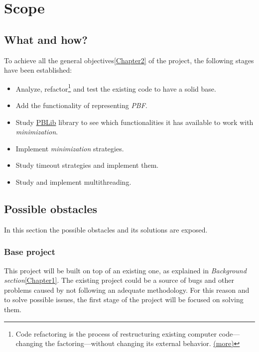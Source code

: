 \chapter{Scope} %

\label{Chapter3} %

\section{What and how?}

To achieve all the general objectives\ref{Chapter2} of the project, the following stages have been established:
\begin{itemize}
	\item Analyze, refactor\footnote{Code refactoring is the process of restructuring existing computer code—changing the factoring—without changing its external behavior. \href{https://en.wikipedia.org/wiki/Code_refactoring}{(more)}} and test the existing code to have a solid base. 
	\item Add the functionality of representing \emph{PBF}.
	\item Study \href{http://tools.computational-logic.org/content/pblib.php}{PBLib} library to see which functionalities it has available to work with \emph{minimization}.
	\item Implement \emph{minimization} strategies.
	\item Study timeout strategies and implement them.
	\item Study and implement multithreading.
\end{itemize}

\section{Possible obstacles}

In this section the possible obstacles and its solutions are exposed.

\subsection{Base project}
This project will be built on top of an existing one, as explained in \emph{Background section}\ref{Chapter1}. The existing project could be a source of bugs and other problems caused by not following an adequate methodology. For this reason and to solve possible issues, the first stage of the project will be focused on solving them.
